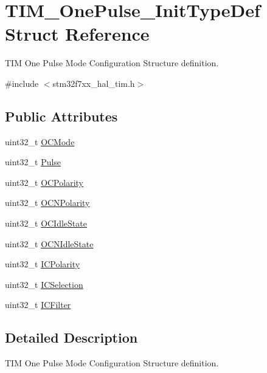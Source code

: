 \hypertarget{struct_t_i_m___one_pulse___init_type_def}{}\section{T\+I\+M\+\_\+\+One\+Pulse\+\_\+\+Init\+Type\+Def Struct Reference}
\label{struct_t_i_m___one_pulse___init_type_def}


T\+IM One Pulse Mode Configuration Structure definition.  




{\ttfamily \#include $<$stm32f7xx\+\_\+hal\+\_\+tim.\+h$>$}

\subsection*{Public Attributes}
\begin{DoxyCompactItemize}
\item 
uint32\+\_\+t \mbox{\hyperlink{struct_t_i_m___one_pulse___init_type_def_af127f01162853e39ae616b43cc52b674}{O\+C\+Mode}}
\item 
uint32\+\_\+t \mbox{\hyperlink{struct_t_i_m___one_pulse___init_type_def_a4f1fbf6d60812c3194e9ee8a05f5cfa6}{Pulse}}
\item 
uint32\+\_\+t \mbox{\hyperlink{struct_t_i_m___one_pulse___init_type_def_a3028787ad41698072cbf70ddf1b6c984}{O\+C\+Polarity}}
\item 
uint32\+\_\+t \mbox{\hyperlink{struct_t_i_m___one_pulse___init_type_def_a00deac6c3347b0482955d936351c6388}{O\+C\+N\+Polarity}}
\item 
uint32\+\_\+t \mbox{\hyperlink{struct_t_i_m___one_pulse___init_type_def_aef11bcea1dbf3e3ddf2a4bbc2846bb1e}{O\+C\+Idle\+State}}
\item 
uint32\+\_\+t \mbox{\hyperlink{struct_t_i_m___one_pulse___init_type_def_a37bc0a680d53458bf4c42ebb277b0c2c}{O\+C\+N\+Idle\+State}}
\item 
uint32\+\_\+t \mbox{\hyperlink{struct_t_i_m___one_pulse___init_type_def_a8589cf95218ea62604b845054b36b772}{I\+C\+Polarity}}
\item 
uint32\+\_\+t \mbox{\hyperlink{struct_t_i_m___one_pulse___init_type_def_a9e8853f17e85393a869aa2ecb315f030}{I\+C\+Selection}}
\item 
uint32\+\_\+t \mbox{\hyperlink{struct_t_i_m___one_pulse___init_type_def_a883e69dec14d8bde9914906be1b04ad7}{I\+C\+Filter}}
\end{DoxyCompactItemize}


\subsection{Detailed Description}
T\+IM One Pulse Mode Configuration Structure definition. 

